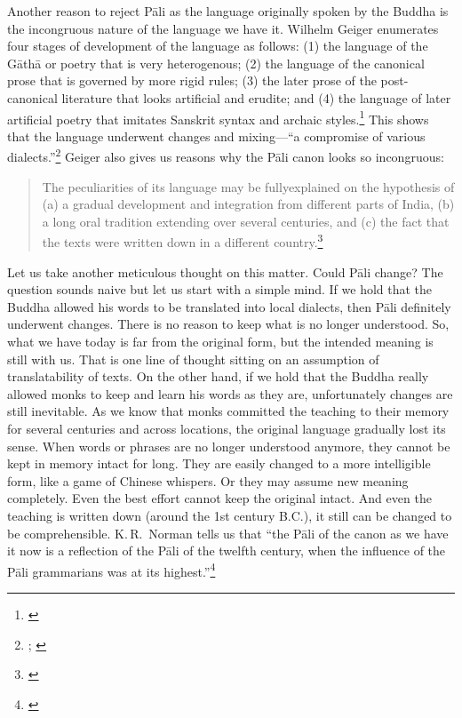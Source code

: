 Another reason to reject P\=ali as the language originally spoken by the Buddha is the incongruous nature of the language we have it. Wilhelm Geiger enumerates four stages of development of the language as follows: (1) the language of the G\=ath\=a or poetry that is very heterogenous; (2) the language of the canonical prose that is governed by more rigid rules; (3) the later prose of the post-canonical literature that looks artificial and erudite; and (4) the language of later artificial poetry that imitates Sanskrit syntax and archaic styles.\footnote{\citealp[pp.~1--2]{geiger:literature}} This shows that the language underwent changes and mixing---``a compromise of various dialects.''\footnote{\citealp[p.~2]{geiger:literature}; \citealp[p.~1]{geiger:grammar}} Geiger also gives us reasons why the P\=ali canon looks so incongruous: 

\begin{quote}
The peculiarities of its language may be fully\linebreak explained on the hypothesis of (a) a gradual development and integra­tion from different parts of India, (b) a long oral tradition extending over several centuries, and (c) the fact that the texts were written down in a different country.\footnote{\citealp[p.~5]{geiger:literature}}
\end{quote}

Let us take another meticulous thought on this matter. Could P\=ali change? The question sounds naive but let us start with a simple mind. If we hold that the Buddha allowed his words to be translated into local dialects, then P\=ali definitely underwent changes. There is no reason to keep what is no longer understood. So, what we have today is far from the original form, but the intended meaning is still with us. That is one line of thought sitting on an assumption of translatability of texts. On the other hand, if we hold that the Buddha really allowed monks to keep and learn his words as they are, unfortunately changes are still inevitable. As we know that monks committed the teaching to their memory for several centuries and across locations, the original language gradually lost its sense. When words or phrases are no longer understood anymore, they cannot be kept in memory intact for long. They are easily changed to a more intelligible form, like a game of Chinese whispers. Or they may assume new meaning completely. Even the best effort cannot keep the original intact. And even the teaching is written down (around the 1st century B.C.), it still can be changed to be comprehensible. K.\,R.\ Norman tells us that ``the P\=ali of the canon as we have it now is a reflection of the P\=ali of the twelfth century, when the influence of the P\=ali grammarians was at its highest.''\footnote{\citealp[p.~6]{norman:literature}}

